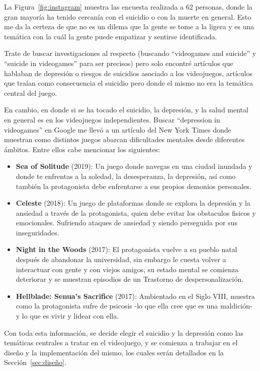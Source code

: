 La Figura~\ref{fig:instagram} muestra las encuesta realizada a 62 personas, donde la gran mayoría ha tenido cercanía con el suicidio o con la muerte en general. Esto me da la certeza de que no es un dilema que la gente se tome a la ligera y es una temática con la cuál la gente puede empatizar y sentirse identificada.

Trate de buscar investigaciones al respecto (buscando ``videogames and suicide'' y ``suicide in videogames'' para ser precisos) pero solo encontré artículos que hablaban de depresión o riesgos de suicidios asociado a los videojuegos\cite{suicide-risk}, artículos que traían como consecuencia el suicidio pero donde el mismo no era la temática central del juego.

En cambio, en donde si se ha tocado el suicidio, la depresión, y la salud mental en general es en los videojuegos independientes. Buscar ``depression in videogames'' en Google me llevó a un artículo del New York Times\cite{new-york-times} donde muestran como distintos juegos abarcan dificultades mentales desde diferentes ámbitos. Entre ellos cabe mencionar los siguientes:

\begin{itemize}
    \item \textbf{Sea of Solitude} (2019): Un juego donde navegas en una ciudad inundada y donde te enfrentas a la soledad, la desesperanza, la depresión, así como también la protagonista debe enfrentarse a sus propios demonios personales.
    \item \textbf{Celeste} (2018): Un juego de plataformas donde se explora la depresión y la ansiedad a través de la protagonista, quien debe evitar los obstaculos fisicos y emocionales. Sufriendo ataques de ansiedad y siendo perseguida por sus inseguridades.
    \item \textbf{Night in the Woods} (2017): El protagonista vuelve a su pueblo natal después de abandonar la universidad, sin embargo le cuesta volver a interactuar con gente y con viejos amigos, su estado mental se comienza deteriorar y se muestran episodios de un Trastorno de despersonalización.
    \item \textbf{Hellblade: Senua's Sacrifice} (2017): Ambientado en el Siglo VIII, muestra como la protagonista sufre de psicosis -lo que ella cree que es una maldición- y lo que es vivir y lidear con ella.
\end{itemize}

Con toda esta información, se decide elegir el suicidio y la depresión como las temáticas centrales a tratar en el videojuego, y se comienza a trabajar en el diseño y la implementación del mismo, los cuales serán detallados en la Sección~\ref{sec:diseño}.

